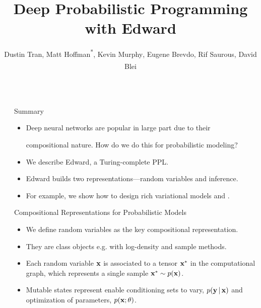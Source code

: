 \documentclass[final]{beamer}
\title{Deep Probabilistic Programming with Edward}
\author{Dustin Tran\textsuperscript{\textdagger},
Matt Hoffman\textsuperscript{*}\textsuperscript{\ddag},
Kevin Murphy\textsuperscript{\ddag},
Eugene Brevdo\textsuperscript{\ddag},
Rif Saurous\textsuperscript{\ddag},
David Blei\textsuperscript{\textdagger}}
\institute{
\textsuperscript{\textdagger}Columbia University,
\textsuperscript{*}Adobe Research,
\textsuperscript{\ddag}Google
}
\begin{document}
\begin{frame}[t]
\begin{columns}[t]

\begin{column}{\sepwid}\end{column} %

\begin{column}{\onecolwid}

\begin{alertblock}{Summary}
\begin{itemize}
  \item
Deep neural networks are popular in large part due to their

compositional nature. How do we do this for
probabilistic modeling?
  \item We describe
Edward, a Turing-complete \acrlong{PPL}.
\item Edward builds
two representations---random variables and
inference.
\item
For example, we show how to design rich variational models and .
\end{itemize}
\end{alertblock}

\begin{block}{Compositional Representations for Probabilistic Models}
\begin{itemize}
\item
We define random variables as the key compositional representation.
\item
They are class objects e.g. with log-density and sample methods.
\item
Each random variable $\boldsymbol{\mathbf{x}}$ is associated to a
tensor $\boldsymbol{\mathbf{x}}^*$ in the computational graph, which represents a single
sample $\boldsymbol{\mathbf{x}}^*\sim p(\boldsymbol{\mathbf{x}})$.
\item
Mutable states represent enable conditioning sets to vary,
$p(\boldsymbol{\mathbf{y}}\,|\,\boldsymbol{\mathbf{x}})$ and optimization of parameters, $p(\boldsymbol{\mathbf{x}}; \theta)$.
\end{itemize}
\end{block}


\end{column}
\end{columns}
\end{frame}
\end{document}
